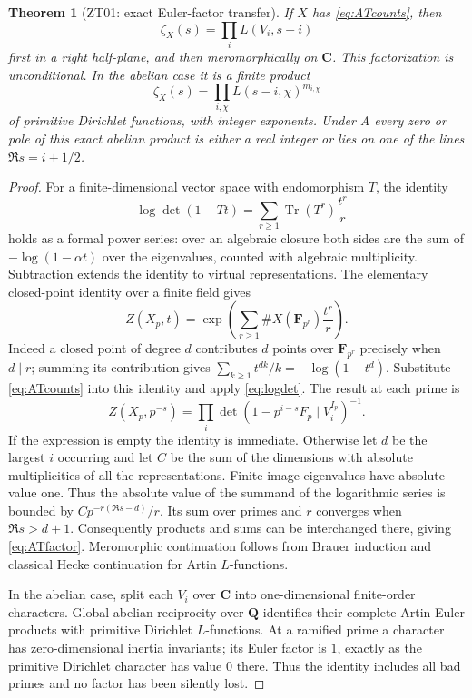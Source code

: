 \documentclass[11pt,a4paper]{article}
\newtheorem{theorem}{Theorem}[section]
\theoremstyle{definition}
\begin{document}
\begin{theorem}[ZT01: exact Euler-factor transfer]\label{ZT01}
If $X$ has \eqref{eq:ATcounts}, then
\begin{equation}\label{eq:ATfactor}
 \zeta_X(s)=\prod_i L(V_i,s-i)
\end{equation}
first in a right half-plane, and then meromorphically on $\mathbf C$.
This factorization is unconditional.  In the abelian case it is a
finite product
\[
 \zeta_X(s)=\prod_{i,\chi}L(s-i,\chi)^{m_{i,\chi}}
\]
of primitive Dirichlet functions, with integer exponents.
Under A every zero or pole of this exact abelian product is either a
real integer or lies on one of the lines $\Re s=i+1/2$.
\end{theorem}

\begin{proof}
For a finite-dimensional vector space with endomorphism $T$, the
identity
\begin{equation}\label{eq:logdet}
 -\log\det(1-Tt)=\sum_{r\geq1}\operatorname{Tr}(T^r)\frac{t^r}{r}
\end{equation}
holds as a formal power series: over an algebraic closure both sides
are the sum of $-\log(1-\alpha t)$ over the eigenvalues, counted with
algebraic multiplicity.  Subtraction extends the identity to virtual
representations.  The elementary closed-point identity over a finite
field gives
\[
 Z(X_p,t)=\exp\left(\sum_{r\geq1}
          \#X(\mathbf F_{p^r})\frac{t^r}{r}\right).
\]
Indeed a closed point of degree $d$ contributes $d$ points over
$\mathbf F_{p^r}$ precisely when $d\mid r$; summing its contribution
gives $\sum_{k\geq1}t^{dk}/k=-\log(1-t^d)$.
Substitute \eqref{eq:ATcounts} into this identity and apply
\eqref{eq:logdet}.  The result at each prime is
\[
 Z(X_p,p^{-s})
   =\prod_i\det(1-p^{i-s}F_p\mid V_i^{I_p})^{-1}.
\]
If the expression is empty the identity is immediate. Otherwise let $d$ be the largest $i$ occurring and let $C$ be the sum of the
dimensions with absolute multiplicities of all the representations.
Finite-image eigenvalues have absolute value one.  Thus the absolute
value of the summand of the logarithmic series is bounded by
$Cp^{-r(\Re s-d)}/r$.  Its sum over primes and $r$ converges when
$\Re s>d+1$.  Consequently products and sums can be interchanged there,
giving \eqref{eq:ATfactor}.  Meromorphic continuation follows from
Brauer induction and classical Hecke continuation for Artin $L$-functions.

In the abelian case, split each $V_i$ over $\mathbf C$ into
one-dimensional finite-order characters.  Global abelian reciprocity
over $\mathbf Q$ identifies their complete Artin Euler products with
primitive Dirichlet $L$-functions.  At a ramified prime a character has
zero-dimensional inertia invariants; its Euler factor is $1$, exactly
as the primitive Dirichlet character has value $0$ there.  Thus the
identity includes all bad primes and no factor has been silently lost.


\end{proof}
\end{document}
